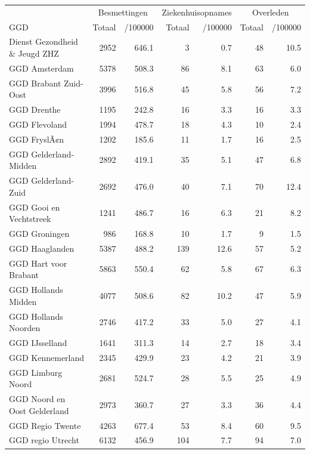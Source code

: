 \documentclass[
  english,
  man,floatsintext]{apa6}
\begin{document}
\begin{table}[H]
\centering\begingroup\fontsize{10}{12}\selectfont

\begin{threeparttable}
\begin{tabular}{lrrrrrr}
\toprule
\multicolumn{1}{c}{ } & \multicolumn{2}{c}{Besmettingen} & \multicolumn{2}{c}{Ziekenhuisopnames} & \multicolumn{2}{c}{Overleden} \\
\cmidrule(l{3pt}r{3pt}){2-3} \cmidrule(l{3pt}r{3pt}){4-5} \cmidrule(l{3pt}r{3pt}){6-7}
GGD & Totaal & /100000 & Totaal & /100000 & Totaal & /100000\\
\midrule
Dienst Gezondheid \& Jeugd ZHZ & 2952 & 646.1 & 3 & 0.7 & 48 & 10.5\\
GGD Amsterdam & 5378 & 508.3 & 86 & 8.1 & 63 & 6.0\\
GGD Brabant Zuid-Oost & 3996 & 516.8 & 45 & 5.8 & 56 & 7.2\\
GGD Drenthe & 1195 & 242.8 & 16 & 3.3 & 16 & 3.3\\
GGD Flevoland & 1994 & 478.7 & 18 & 4.3 & 10 & 2.4\\
GGD FryslÃ¢n & 1202 & 185.6 & 11 & 1.7 & 16 & 2.5\\
GGD Gelderland-Midden & 2892 & 419.1 & 35 & 5.1 & 47 & 6.8\\
GGD Gelderland-Zuid & 2692 & 476.0 & 40 & 7.1 & 70 & 12.4\\
GGD Gooi en Vechtstreek & 1241 & 486.7 & 16 & 6.3 & 21 & 8.2\\
GGD Groningen & 986 & 168.8 & 10 & 1.7 & 9 & 1.5\\
GGD Haaglanden & 5387 & 488.2 & 139 & 12.6 & 57 & 5.2\\
GGD Hart voor Brabant & 5863 & 550.4 & 62 & 5.8 & 67 & 6.3\\
GGD Hollands Midden & 4077 & 508.6 & 82 & 10.2 & 47 & 5.9\\
GGD Hollands Noorden & 2746 & 417.2 & 33 & 5.0 & 27 & 4.1\\
GGD IJsselland & 1641 & 311.3 & 14 & 2.7 & 18 & 3.4\\
GGD Kennemerland & 2345 & 429.9 & 23 & 4.2 & 21 & 3.9\\
GGD Limburg Noord & 2681 & 524.7 & 28 & 5.5 & 25 & 4.9\\
GGD Noord en Oost Gelderland & 2973 & 360.7 & 27 & 3.3 & 36 & 4.4\\
GGD Regio Twente & 4263 & 677.4 & 53 & 8.4 & 60 & 9.5\\
GGD regio Utrecht & 6132 & 456.9 & 104 & 7.7 & 94 & 7.0\\

\end{tabular}
\end{threeparttable}
\end{table}
\end{document}
